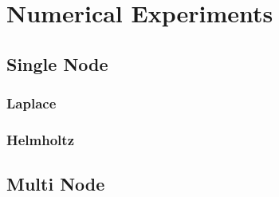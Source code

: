 \chapter{Numerical Experiments}\label{chpt:experiments}
\thispagestyle{chaptertitle} %


\section{Single Node}\label{chpt:experiments:sec:single_node}

\subsection{Laplace}

\subsection{Helmholtz}


\section{Multi Node}

